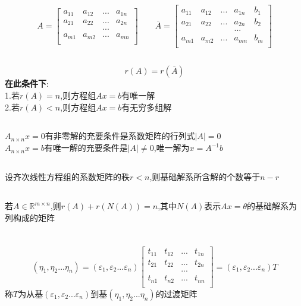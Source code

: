 \documentclass[11pt, a4paper, UTF8]{ctexart}
\begin{document}
\subsection{}
\[
A=\begin{bmatrix}
a_{11}&a_{12}&...&a_{1n}\\
a_{21}&a_{22}&...&a_{2n}\\
&&...&\\
a_{m1}&a_{m2}&...&a_{mn}\\
\end{bmatrix}
\qquad\bar A=\begin{bmatrix}
a_{11}&a_{12}&...&a_{1n}&b_1\\
a_{21}&a_{22}&...&a_{2n}&b_2\\
&&&...&\\
a_{m1}&a_{m2}&...&a_{mn}&b_m\\
\end{bmatrix}\]
\subsection{}
\[r(A)=r(\bar A)\]
\textbf{在此条件下}:\\
1.若$r(A)=n$,则方程组$Ax=b$有唯一解\\
2.若$r(A)<n$,则方程组$Ax=b$有无穷多组解
\subsection{}
$A_{n\times n}x=0$有非零解的充要条件是系数矩阵的行列式$|A|=0$\\
$A_{n\times n}x=b$有唯一解的充要条件是$|A|\not=0$,唯一解为$x=A^{-1}b$
\subsection{}
设齐次线性方程组的系数矩阵的秩$r<n$,则基础解系所含解的个数等于$n-r$
\subsection{}
若$A\in\mathbb{R}^{m\times n}$,则$r(A)+r(N(A))=n$,其中$N(A)$表示$Ax=\theta$的基础解系为列构成的矩阵
\section{}
\[(\eta_1,\eta_2...\eta_n)=(\varepsilon_1,\varepsilon_2...\varepsilon_n)\begin{bmatrix}
t_{11}&t_{12}&...&t_{1n}\\
t_{21}&t_{22}&...&t_{2n}\\
&&...&\\
t_{n1}&t_{n2}&...&t_{nn}\\
\end{bmatrix}=(\varepsilon_1,\varepsilon_2...\varepsilon_n)T\]
称$T$为从基$(\varepsilon_1,\varepsilon_2...\varepsilon_n)$到基$(\eta_1,\eta_2...\eta_n)$的过渡矩阵\\
\end{document}
